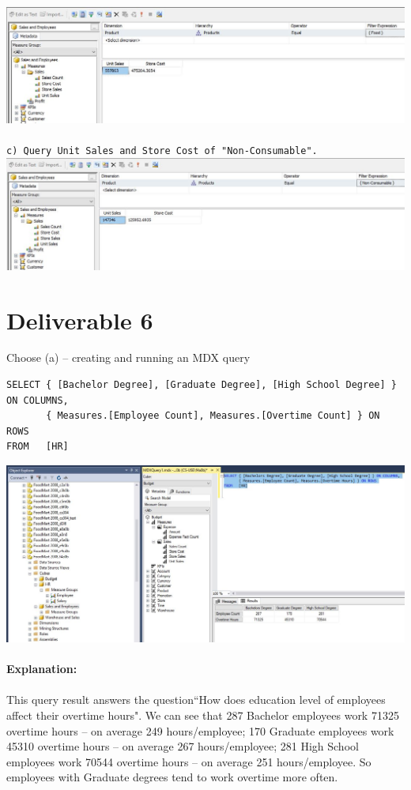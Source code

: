\documentclass{article}
\begin{document}
\noindent \includegraphics[scale=0.71]{deliverable5_2.jpg}\\
\\
\noindent \texttt{c) Query Unit Sales and Store Cost of "Non-Consumable".}\\

\noindent \includegraphics[scale=0.7]{deliverable5_3.jpg}

\section{Deliverable 6}

Choose (a) -- creating and running an MDX query

\begin{verbatim}
SELECT { [Bachelor Degree], [Graduate Degree], [High School Degree] } ON COLUMNS,
       { Measures.[Employee Count], Measures.[Overtime Count] } ON ROWS
FROM   [HR]
\end{verbatim}

\noindent \includegraphics[scale=0.6]{deliverable6.jpg}\\
\\
\noindent \textbf{Explanation:}\\
\\
This query result answers the question``How does education level of employees affect their overtime hours". We can see that 287 Bachelor employees work 71325 overtime hours -- on average 249 hours/employee; 170 Graduate employees work 45310 overtime hours -- on average 267 hours/employee; 281 High School employees work 70544 overtime hours -- on average 251 hours/employee. So employees with Graduate degrees tend to work overtime more often.
\end{document}
